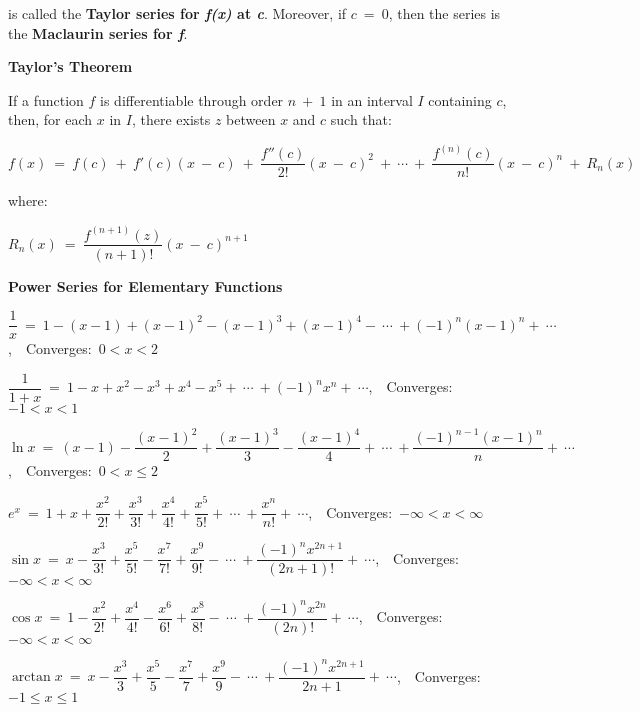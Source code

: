 \documentclass{article}
\begin{document}
\begin{large}
\hspace{0.1in} is called the \textbf{Taylor series for \textit{f(x)} at \textit{c}}.  Moreover, if $c\ =\ 0$, then the series is the \textbf{Maclaurin series for \textit{f}}.

\textbf{Taylor's Theorem}

\hspace{0.1in} If a function $f$ is differentiable through order $n\ +\ 1$ in an interval $I$ containing $c$, then, for each $x$ in $I$, there exists $z$ between $x$ and $c$ such that:

\hspace{0.2in} $f(x)\ =\ f(c)\ +\ f'(c)(x\ -\ c)\ +\ \dfrac{f''(c)}{2!}(x\ -\ c)^{2}\ +\ \cdots\ +\ \dfrac{f^{(n)}(c)}{n!}(x\ -\ c)^{n}\ +\ R_{n}(x)$

\hspace{0.1in} where:

\hspace{2.5in} $R_{n}(x)\ =\ \dfrac{f^{(n+1)}(z)}{(n+1)!}(x\ -\ c)^{n+1}$

\vspace{0.5in}
\textbf{Power Series for Elementary Functions}

\begin{large}

$\dfrac{1}{x}\ =\ 1-(x-1)+(x-1)^{2}-(x-1)^{3}+(x-1)^{4}-\ \cdots\ +(-1)^{n}(x-1)^{n}+\ \cdots$,\ \ Converges:\ $0<x<2$

$\dfrac{1}{1+x}\ =\ 1-x+x^{2}-x^{3}+x^{4}-x^{5}+\ \cdots\ +(-1)^{n}x^{n}+\ \cdots$,\ \ Converges:\ $-1<x<1$

$\ln x\ =\ (x-1)-\dfrac{(x-1)^{2}}{2}+\dfrac{(x-1)^{3}}{3}-\dfrac{(x-1)^{4}}{4}+\ \cdots\ +\dfrac{(-1)^{n-1}(x-1)^{n}}{n}+\ \cdots$,\ \ Converges:\ $0<x\leq 2$

$e^{x}\ =\ 1+x+\dfrac{x^{2}}{2!}+\dfrac{x^{3}}{3!}+\dfrac{x^{4}}{4!}+\dfrac{x^{5}}{5!}+\ \cdots\ +\dfrac{x^{n}}{n!}+\ \cdots$,\ \ Converges:\ $-\infty<x<\infty$

$\sin x\ =\ x-\dfrac{x^{3}}{3!}+\dfrac{x^{5}}{5!}-\dfrac{x^{7}}{7!}+\dfrac{x^{9}}{9!}-\ \cdots\ +\dfrac{(-1)^{n}x^{2n+1}}{(2n+1)!}+\ \cdots$,\ \ Converges:\ $-\infty<x<\infty$

$\cos x\ =\ 1-\dfrac{x^{2}}{2!}+\dfrac{x^{4}}{4!}-\dfrac{x^{6}}{6!}+\dfrac{x^{8}}{8!}-\ \cdots\ +\dfrac{(-1)^{n}x^{2n}}{(2n)!}+\ \cdots$,\ \ Converges:\ $-\infty<x<\infty$

$\arctan x\ =\ x-\dfrac{x^{3}}{3}+\dfrac{x^{5}}{5}-\dfrac{x^{7}}{7}+\dfrac{x^{9}}{9}-\ \cdots\ +\dfrac{(-1)^{n}x^{2n+1}}{2n+1}+\ \cdots$,\ \ Converges:\ $-1\leq x\leq 1$


\end{large}
\end{large}
\end{document}
